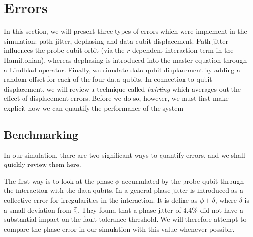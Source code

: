 \section{Errors} \label{sec:errors}
In this section, we will present three types of errors which were implement in the simulation: path jitter, dephasing and data qubit displacement. Path jitter influences the probe qubit orbit (via the $r$-dependent interaction term in the Hamiltonian), whereas dephasing is introduced into the master equation through a Lindblad operator. Finally, we simulate data qubit displacement by adding a random offset for each of the four data qubits. In connection to qubit displacement, we will review a technique called \emph{twirling} which averages out the effect of displacement errors. Before we do so, however, we must first make explicit how we can quantify the performance of the system. 

\subsection{Benchmarking}
In our simulation, there are two significant ways to quantify errors, and we shall quickly review them here.

The first way is to look at the phase $\phi$ accumulated by the probe qubit through the interaction with the data qubits. In \citet{OGorman2016} a general phase jitter is introduced as a collective error for irregularities in the interaction. It is define as $\phi + \delta$, where $\delta$ is a small deviation from $\frac{\pi}{2}$.  They found that a phase jitter of $4.4 \%$ did not have a substantial impact on the fault-tolerance threshold. We will therefore attempt to compare the phase error in our simulation with this value whenever possible. %

